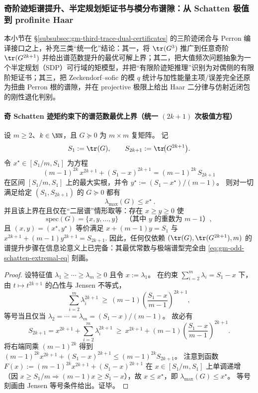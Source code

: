 \subsubsection{奇阶迹矩谱提升、半定规划矩证书与模分布谱隙：从 Schatten 极值到 profinite Haar}\label{subsubsec:gm-odd-moment-sdp-modq-profinite}
本小节在 \S\ref{subsubsec:gm-third-trace-dual-certificates} 的三阶迹闭合与 Perron 编译接口之上，补充三类“统一化”结论：其一，将 \(\tr(G^3)\) 推广到任意奇阶 \(\tr(G^{2k+1})\) 并给出谱范数提升的最优可解上界；其二，把大值频次问题抽象为一个半定规划（SDP）可行域的矩模型，并把“有限阶迹矩推理”识别为对偶侧的有限阶矩证书；其三，把 Zeckendorf--sofic 的模 \(q\) 统计与加性能量主项/误差完全还原为扭曲 Perron 根的谱隙，并在 projective 极限上给出 Haar 二分律与仿射近闭包的刚性退化判别。

\paragraph{奇 Schatten 迹矩约束下的谱范数最优上界（统一 \texorpdfstring{$(2k+1)$}{2k+1} 次极值方程）}
\begin{theorem}\label{thm:gm-odd-schatten-spectral-norm-extremal}
设 \(m\ge 2\)、\(k\in\NN\)，且 \(G\succeq 0\) 为 \(m\times m\) 复矩阵。
记
\[
S_1:=\tr(G),\qquad S_{2k+1}:=\tr\!\bigl(G^{2k+1}\bigr).
\]
令 \(x^\star\in[S_1/m,S_1]\) 为方程
\begin{equation}\label{eq:gm-odd-schatten-extremal-eq}
\boxed{\ (m-1)^{2k}\,x^{2k+1}+(S_1-x)^{2k+1}=(m-1)^{2k}\,S_{2k+1}\ }
\end{equation}
在区间 \([S_1/m,S_1]\) 上的最大实根，并令 \(y^\star:=(S_1-x^\star)/(m-1)\)。
则对一切满足给定 \((S_1,S_{2k+1})\) 的 \(G\succeq0\) 都有
\[
\boxed{\ \lambda_{\max}(G)\le x^\star\ }.
\]
并且该上界在且仅在“二层谱”情形取等：存在 \(x\ge y\ge 0\) 使
\[
\mathrm{spec}(G)=\{x,y,\dots,y\}\quad\text{（其中 \(y\) 的重数为 \(m-1\)）},
\]
且 \((x,y)=(x^\star,y^\star)\) 等价满足
\(
x+(m-1)y=S_1
\) 与
\(
x^{2k+1}+(m-1)y^{2k+1}=S_{2k+1}.
\)
因此，任何仅依赖 \((\tr(G),\tr(G^{2k+1}),m)\) 的谱提升步骤在信息论意义上已完备：其最优常数与极端谱型完全由 \eqref{eq:gm-odd-schatten-extremal-eq} 刻画。
\end{theorem}

\begin{proof}
设特征值 \(\lambda_1\ge\cdots\ge\lambda_m\ge 0\) 且令 \(x:=\lambda_1\)。
在约束 \(\sum_{i=2}^m\lambda_i=S_1-x\) 下，由 \(t\mapsto t^{2k+1}\) 的凸性与 Jensen 不等式，
\[
\sum_{i=2}^m\lambda_i^{2k+1}\ \ge\ (m-1)\left(\frac{S_1-x}{m-1}\right)^{2k+1},
\]
等号当且仅当 \(\lambda_2=\cdots=\lambda_m=(S_1-x)/(m-1)\)。
故必有
\[
S_{2k+1}
=x^{2k+1}+\sum_{i=2}^m\lambda_i^{2k+1}
\ \ge\ x^{2k+1}+(m-1)\left(\frac{S_1-x}{m-1}\right)^{2k+1}.
\]
将右端同乘 \((m-1)^{2k}\) 得到
\(
(m-1)^{2k}x^{2k+1}+(S_1-x)^{2k+1}\le (m-1)^{2k}S_{2k+1}
\)。
注意到函数
\(
F(x):=(m-1)^{2k}x^{2k+1}+(S_1-x)^{2k+1}
\)
在 \(x\in[S_1/m,S_1]\) 上单调递增（因 \(x\ge S_1/m\Rightarrow (m-1)x\ge S_1-x\)），故 \(x\le x^\star\)，即 \(\lambda_{\max}(G)\le x^\star\)。
等号刻画由 Jensen 等号条件给出。证毕。
\end{proof}

